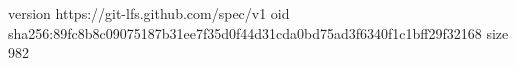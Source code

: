 version https://git-lfs.github.com/spec/v1
oid sha256:89fc8b8c09075187b31ee7f35d0f44d31cda0bd75ad3f6340f1c1bff29f32168
size 982
